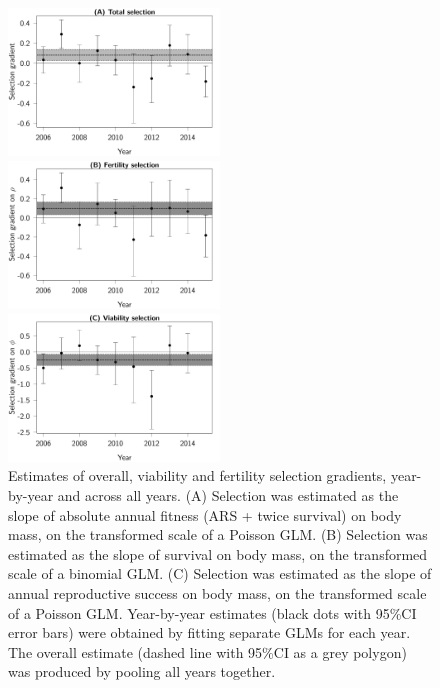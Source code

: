 \begin{figure}[ht]
\centering
	\includegraphics[width=0.5\textwidth]{FiguresFluSel/SelByYear-1}
	
	\includegraphics[width=0.5\textwidth]{FiguresFluSel/SelByYearRho-1}
	
	\includegraphics[width=0.5\textwidth]{FiguresFluSel/SelByYearPhi-1}
	\caption{Estimates of overall, viability and fertility selection gradients, year-by-year and across all years. (A) Selection was estimated as the slope of absolute annual fitness (ARS + twice survival) on body mass, on the transformed scale of a Poisson GLM. (B) Selection was estimated as the slope of survival on body mass, on the transformed scale of a binomial GLM. (C) Selection was estimated as the slope of annual reproductive success on body mass, on the transformed scale of a Poisson GLM.
	Year-by-year estimates (black dots with 95\%CI error bars) were obtained by fitting separate GLMs for each year. The overall estimate (dashed line with 95\%CI as a grey polygon) was produced by pooling all years together.}
	\label{fig:yearSel}
\end{figure}

